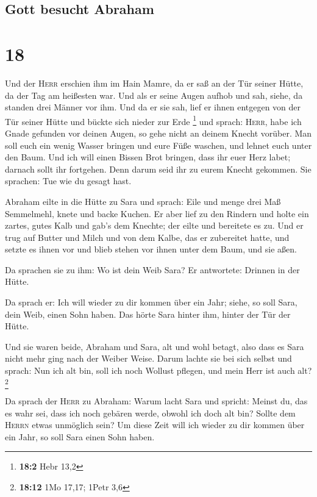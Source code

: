 \hypertarget{gott-besucht-abraham}{%
\subsection{Gott besucht Abraham}\label{gott-besucht-abraham}}

\hypertarget{section-17}{%
\section{18}\label{section-17}}

 Und der \textsc{Herr} erschien ihm im Hain Mamre, da er
saß an der Tür seiner Hütte, da der Tag am heißesten war. 
Und als er seine Augen aufhob und sah, siehe, da standen drei Männer vor
ihm. Und da er sie sah, lief er ihnen entgegen von der Tür seiner Hütte
und bückte sich nieder zur Erde \footnote{\textbf{18:2} Hebr 13,2}
 und sprach: \textsc{Herr}, habe ich Gnade gefunden vor
deinen Augen, so gehe nicht an deinem Knecht vorüber.  Man
soll euch ein wenig Wasser bringen und eure Füße waschen, und lehnet
euch unter den Baum.  Und ich will einen Bissen Brot
bringen, dass ihr euer Herz labet; darnach sollt ihr fortgehen. Denn
darum seid ihr zu eurem Knecht gekommen. Sie sprachen: Tue wie du gesagt
hast.

 Abraham eilte in die Hütte zu Sara und sprach: Eile und
menge drei Maß Semmelmehl, knete und backe Kuchen.  Er
aber lief zu den Rindern und holte ein zartes, gutes Kalb und gab's dem
Knechte; der eilte und bereitete es zu.  Und er trug auf
Butter und Milch und von dem Kalbe, das er zubereitet hatte, und setzte
es ihnen vor und blieb stehen vor ihnen unter dem Baum, und sie aßen.

 Da sprachen sie zu ihm: Wo ist dein Weib Sara? Er
antwortete: Drinnen in der Hütte.

 Da sprach er: Ich will wieder zu dir kommen über ein
Jahr; siehe, so soll Sara, dein Weib, einen Sohn haben. Das hörte Sara
hinter ihm, hinter der Tür der Hütte.

 Und sie waren beide, Abraham und Sara, alt und wohl
betagt, also dass es Sara nicht mehr ging nach der Weiber Weise.
 Darum lachte sie bei sich selbst und sprach: Nun ich alt
bin, soll ich noch Wollust pflegen, und mein Herr ist auch alt?
\footnote{\textbf{18:12} 1Mo 17,17; 1Petr 3,6}

 Da sprach der \textsc{Herr} zu Abraham: Warum lacht Sara
und spricht: Meinst du, das es wahr sei, dass ich noch gebären werde,
obwohl ich doch alt bin?  Sollte dem \textsc{Herrn} etwas
unmöglich sein? Um diese Zeit will ich wieder zu dir kommen über ein
Jahr, so soll Sara einen Sohn haben.

